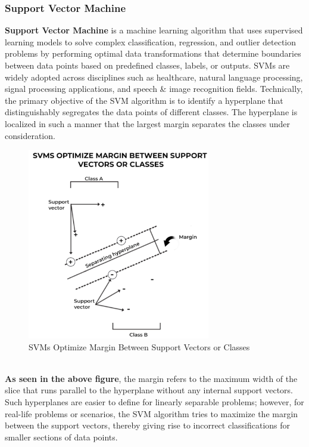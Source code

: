 \documentclass[a4paper]{article}
\theoremstyle{definition}
\begin{document}
\subsubsection{Support Vector Machine}
\textbf{Support Vector Machine} is a machine learning algorithm that uses supervised learning models to solve complex classification, regression, and outlier detection problems by performing optimal data transformations that determine boundaries between data points based on predefined classes, labels, or outputs. SVMs are widely adopted across disciplines such as healthcare, natural language processing, signal processing applications, and speech \& image recognition fields. Technically, the primary objective of the SVM algorithm is to identify a hyperplane that distinguishably segregates the data points of different classes. The hyperplane is localized in such a manner that the largest margin separates the classes under consideration.\\
\begin{figure}[h!]
\begin{center}
\includegraphics[width=8cm]{images/svm_b.png}
\end{center}
\caption{SVMs Optimize Margin Between Support Vectors or Classes}
\end{figure}
\\
\textbf{As seen in the above figure}, the margin refers to the maximum width of the slice that runs parallel to the hyperplane without any internal support vectors. Such hyperplanes are easier to define for linearly separable problems; however, for real-life problems or scenarios, the SVM algorithm tries to maximize the margin between the support vectors, thereby giving rise to incorrect classifications for smaller sections of data points.\\
\end{document}
